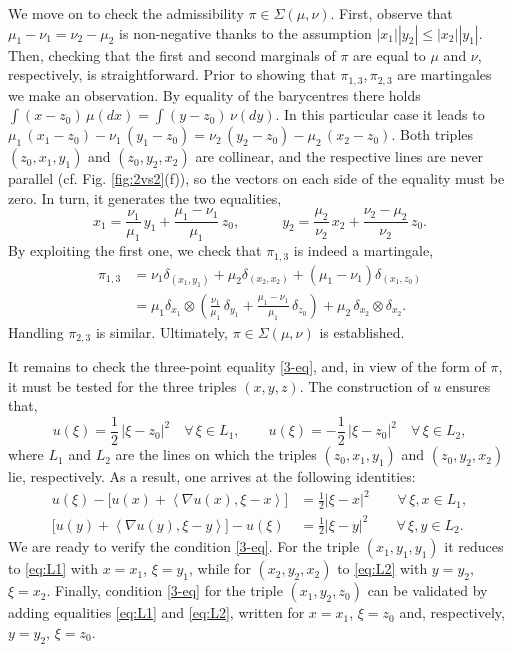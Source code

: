 \documentclass[11pt,letterpaper,reqno]{amsart}
\theoremstyle{definition}
\numberwithin{equation}{section}
\newcommand{\pairing}[1]{{\left \langle #1 \right \rangle}}
\newcommand{\abs}[1]{{\left \lvert #1 \right \rvert}}
\begin{document}
{We move on to check the admissibility $\pi \in \Sigma(\mu,\nu)$. First, observe that $\mu_1 - \nu_1 = \nu_2 - \mu_2$ is non-negative thanks to the assumption $ \abs{x_1}\abs{y_2} \leq \abs{x_2} \abs{y_1}$. Then, checking that the first and second marginals of  $\pi$ are equal to $\mu$ and $\nu$, respectively, is straightforward. Prior to showing that $\pi_{1,3}, \pi_{2,3}$ are martingales we make an observation. By equality of the barycentres there holds 
$\int (x-z_0) \,\mu(dx) = \int (y-z_0) \,\nu(dy)$. In this particular case it leads to $ \mu_1\, (x_1 - z_0) - \nu_1 \, (y_1 - z_0) = 	\nu_2\,(y_2-z_0) - \mu_2\, (x_2-z_0)$. Both triples $(z_0,x_1,y_1)$ and $(z_0,y_2,x_2)$ are collinear, and the respective lines are never parallel (cf. Fig. \ref{fig:2vs2}(f)), so the vectors on each side of the equality must be zero. In turn, it generates the two equalities,
\begin{equation*}
	x_1 = \frac{\nu_1}{\mu_1} \, y_1  +  \frac{\mu_1 - \nu_1}{\mu_1} \,z_0, \qquad \quad y_2 = \frac{\mu_2}{\nu_2} \, x_2 + \frac{\nu_2 - \mu_2}{\nu_2} \, z_0.
\end{equation*}
By exploiting the first one, we check that $\pi_{1,3}$ is indeed a martingale,
\begin{align*}
	\pi_{1,3} &= \nu_1 \delta_{(x_1,y_1)} + \mu_2 \delta_{(x_2,x_2)} + (\mu_1-\nu_1) \delta_{(x_1,z_0)} \\
	&= \mu_1 \delta_{x_1} \otimes \left( \tfrac{\nu_1}{\mu_1} \, \delta_{y_1}  +  \tfrac{\mu_1 - \nu_1}{\mu_1} \, \delta_{z_0}  \right) + \mu_2 \, \delta_{x_2} \otimes \delta_{x_2}.
\end{align*}
Handling $\pi_{2,3}$ is similar. Ultimately,  $\pi \in \Sigma(\mu,\nu)$ is established.

It remains to check the three-point equality \eqref{3-eq}, and, in view of the form of $\pi$, it must be tested for the three triples $(x,y,z)$. The construction of $u$ ensures that,
\begin{equation}
	\label{eq:u_on_segments}
	u(\xi) = \frac{1}{2} \,\abs{\xi-z_0}^2 \quad \forall \, \xi \in L_1,  \qquad 	u(\xi) =- \frac{1}{2} \,\abs{\xi-z_0}^2 \quad \forall \, \xi \in L_2, 
\end{equation}
where $L_1$ and $L_2$ are the lines on which the triples $(z_0,x_1,y_1)$ and $(z_0,y_2,x_2)$ lie, respectively. As a result, one arrives at the following identities:
\begin{align}
	\label{eq:L1}
	u(\xi) - \big[u(x) + \pairing{\nabla u(x),\xi - x} \big]&= \tfrac{1}{2} \abs{\xi-x}^2 \qquad \forall \, \xi,x \in L_1, \\
	\label{eq:L2}
	\big[u(y) + \pairing{\nabla u(y),\xi - y} \big] - u(\xi)&= \tfrac{1}{2} \abs{\xi-y}^2 \qquad \forall \, \xi,y \in L_2.
\end{align}
We are ready to verify the condition \eqref{3-eq}. For the triple $(x_1,y_1,y_1)$ it reduces to \eqref{eq:L1} with $x= x_1$, $\xi = y_1$, while for $(x_2,y_2,x_2)$ to \eqref{eq:L2} with $y= y_2$, $\xi = x_2$. Finally, condition \eqref{3-eq} for the triple $(x_1,y_2,z_0)$ can be validated by adding equalities  \eqref{eq:L1} and  \eqref{eq:L2}, written for $x=x_1$, $\xi = z_0$ and, respectively, $y=y_2$, $\xi = z_0$.

}
\end{document}
